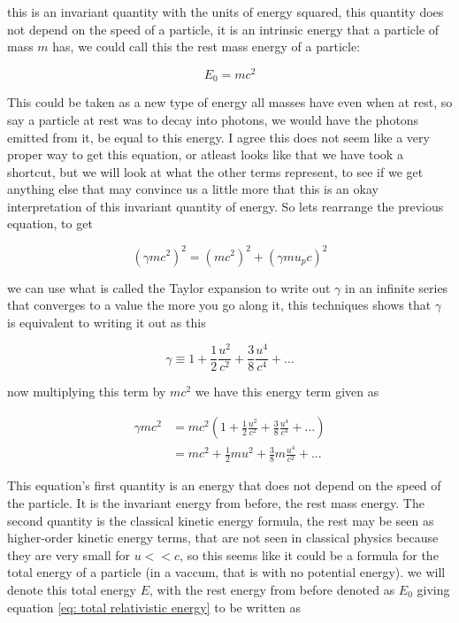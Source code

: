 this is an invariant quantity with the units of energy squared, this quantity does not depend on the speed of a particle, it is an intrinsic energy that a particle of mass $m$ has, we could call this the rest mass energy of a particle:

\begin{equation}
	E_0=mc^2
\end{equation}

This could be taken as a new type of energy all masses have even when at rest, so say a particle at rest was to decay into photons, we would have the photons emitted from it, be equal to this energy.
I agree this does not seem like a very proper way to get this equation, or atleast looks like that we have took a shortcut, but we will look at what the other terms represent, to see if we get anything else that may convince us a little more that this is an okay interpretation of this invariant quantity of energy.
So lets rearrange the previous equation, to get

\begin{equation}
	\label{eq: total relativistic energy}
	\left( \gamma m {c}^2 \right)^2 = ({m}{c}^2)^2 + \left( \gamma {m}{u_p}{c}\right)^2
\end{equation}

we can use what is called the Taylor expansion to write out $\gamma$ in an infinite series that converges to a value the more you go along it, this techniques shows that $\gamma$ is equivalent to writing it out as this

\begin{equation}
	\gamma \equiv 1 + \frac{1}{2}\frac{u^2}{{c}^2} + \frac{3}{8}\frac{u^4}{c^4} + ...
\end{equation}

now multiplying this term by $mc^2$ we have this energy term given as

\begin{equation}
	\begin{aligned}
		\gamma {m}{c}^2 & = {m}{c}^2  \left(1 + \frac{1}{2}\frac{u^2}{{c}^2} + \frac{3}{8}\frac{u^4}{c^4} + ...
		\right)                                                                                                     \\
		                    & = {m}{c}^2 + \frac{1}{2}{m}{u}^2 + \frac{3}{8}m\frac{u^4}{{c}^2} + ...
	\end{aligned}
\end{equation}

This equation's first quantity is an energy that does not depend on the speed of the particle.
It is the invariant energy from before, the rest mass energy.
The second quantity is the classical kinetic energy formula, the rest may be seen as higher-order kinetic energy terms, that are not seen in classical physics because they are very small for ${u}<<{c}$, so this seems like it could be a formula for the total energy of a particle (in a vaccum, that is with no potential energy).
we will denote this total energy ${E}$, with the rest energy from before denoted as $E_0$ giving equation \eqref{eq: total relativistic energy} to be written as


